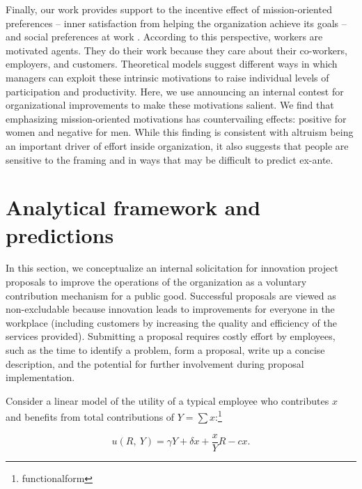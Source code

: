 \documentclass[12pt, titlepage]{article}
\begin{document}
Finally, our work provides support to the incentive effect of
mission-oriented preferences -- inner satisfaction from helping the
organization achieve its goals --
\citep{akerlof2005identity, besley2005competition, delfgaauw2005dedicated, delfgaauw2008incentives, prendergast2007motivation, rotemberg2006altruism}
and social preferences at work
\citep{bandiera2005social, bandiera2008social, bandiera2013team, dellavigna2016estimating}.
According to this perspective, workers are motivated agents. They do
their work because they care about their co-workers, employers, and
customers. Theoretical models suggest different ways in which managers
can exploit these intrinsic motivations to raise individual levels of
participation and productivity. Here, we use announcing an internal
contest for organizational improvements to make these motivations
salient. We find that emphasizing mission-oriented motivations has
countervailing effects: positive for women and negative for men. While
this finding is consistent with altruism being an important driver of
effort inside organization, it also suggests that people are sensitive
to the framing and in ways that may be difficult to predict ex-ante.

\section{Analytical framework and
predictions}\label{analytical-framework-and-predictions}

In this section, we conceptualize an internal solicitation for
innovation project proposals to improve the operations of the
organization as a voluntary contribution mechanism for a public good.
Successful proposals are viewed as non-excludable because innovation
leads to improvements for everyone in the workplace (including customers
by increasing the quality and efficiency of the services provided).
Submitting a proposal requires costly effort by employees, such as the
time to identify a problem, form a proposal, write up a concise
description, and the potential for further involvement during proposal
implementation.

Consider a linear model of the utility of a typical employee who
contributes \(x\) and benefits from total contributions of
\(Y=\sum x\):\footnote{functionalform}

\begin{equation} \label{eq:utility}
  u(R,~ Y) =  \gamma Y + \delta x + \frac{x}{Y} R - c x.
\end{equation}
\end{document}
